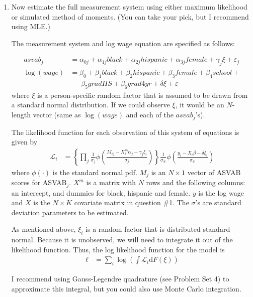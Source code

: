 \documentclass[12pt,english]{article}
\begin{document}
\begin{enumerate}
\item Now estimate the full measurement system using either maximum likelihood or simulated method of moments. (You can take your pick, but I recommend using MLE.) 
 
The measurement system and log wage equation are specified as follows:

\begin{align}
    asvab_j &= \alpha_{0j} + \alpha_{1j} black + \alpha_{2j} hispanic + \alpha_{3j} female + \gamma_j\xi + \varepsilon_j \\
    \log(wage) &= \beta_0 + \beta_1 black + \beta_2 hispanic + \beta_3 female + \beta_4 school + \\
    &\phantom{\text{==}}\beta_5 gradHS + \beta_6 grad4yr + \delta \xi + \varepsilon\nonumber
\end{align}
where $\xi$ is a person-specific random factor that is assumed to be drawn from a standard normal distribution. If we could observe $\xi$, it would be an $N$-length vector (same as $\log(wage)$ and each of the $asvab_j$'s).

The likelihood function for each observation of this system of equations is given by
\begin{align}
    \mathcal{L}_i &= \left\{\prod_j \frac{1}{\sigma_j}\phi\left(\frac{M_{ij} - X^m_{i}\alpha_j - \gamma_j \xi_i}{\sigma_j}\right)\right\}\frac{1}{\sigma_w}\phi\left(\frac{y_i - X_{i}\beta - \delta \xi_i}{\sigma_w}\right)
\end{align}
where $\phi\left(\cdot\right)$ is the standard normal pdf. $M_j$ is an $N\times 1$ vector of ASVAB scores for ASVAB$_j$. $X^m$ is a matrix with $N$ rows and the following columns: an intercept, and dummies for black, hispanic and female. $y$ is the log wage and $X$ is the $N\times K$ covariate matrix in question \#1. The $\sigma$'s are standard deviation parameters to be estimated.

As mentioned above, $\xi_i$ is a random factor that is distributed standard normal. Because it is unobserved, we will need to integrate it out of the likelihood function. Thus, the log likelihood function for the model is
\begin{align}
    \ell &= \sum_i \log\left(\int \mathcal{L}_i \text{d} F\left(\xi\right)\right)
\end{align}

I recommend using Gauss-Legendre quadrature (see Problem Set 4) to approximate this integral, but you could also use Monte Carlo integration. 



\end{enumerate}
\end{document}
